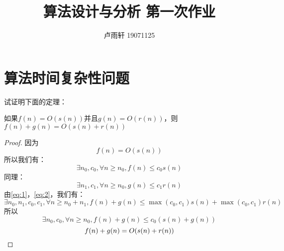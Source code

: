 \documentclass{ctexart}
\title{算法设计与分析 第一次作业}
\author{卢雨轩 19071125}
\begin{document}
\maketitle

\section{算法时间复杂性问题}

\begin{outline}[enumerate]
    \1 试证明下面的定理：

        \2 如果$f(n)=O(s(n))$并且$g(n)=O(r(n))$，则$f(n)+g(n)=O(s(n)+r(n))$

        \begin{proof}
            因为
            \begin{equation*}
                f(n)=O(s(n))
            \end{equation*}
            所以我们有：
            \begin{equation}
                \label{eq:1}
                \exists n_0, c_0, \forall n \geq n_0, f(n) \leq c_0s(n)
            \end{equation}
            同理：
            \begin{equation}
                \label{eq:2}
                \exists n_1, c_1, \forall n \geq n_0, g(n) \leq c_1r(n)
            \end{equation}
            由\cref{eq:1}，\cref{eq:2}，我们有：
            \begin{equation*}
                \exists n_0, n_1, c_0, c_1, \forall n \geq n_0 + n_1, f(n) + g(n) \leq \max(c_0,c_1)s(n) + \max(c_0,c_1)r(n)
            \end{equation*}
            所以
            \begin{equation*}
                \exists n_0, c_0, \forall n \geq n_0, f(n) + g(n) \leq c_0(s(n) + g(n))
            \end{equation*}
            \begin{equation*}
                f(n) + g(n) = O(s(n) + r(n))
                \qedhere
            \end{equation*}
        \end{proof}


\end{outline}
\end{document}
